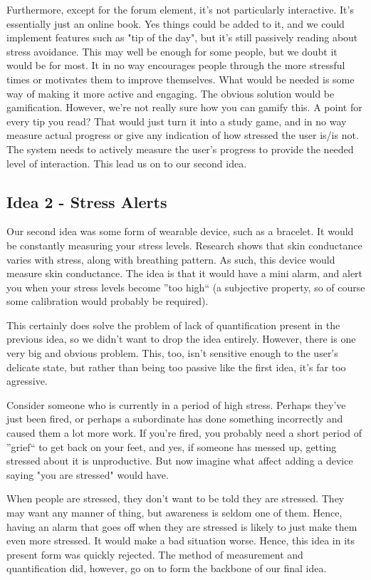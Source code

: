 \documentclass{scrartcl}
\begin{document}
Furthermore, except for the
forum element, it's not particularly interactive. It's essentially just an online book. Yes things could be added to it, and we
could implement features such as "tip of the day", but it's still passively reading about stress avoidance. This may well be
enough for some people, but we doubt it would be for most. It in no way encourages people through the more stressful times or
motivates them to improve themselves. What would be needed is some way of making it more active and engaging. The obvious
solution would be gamification. However, we're not really sure how you can gamify this. A point for every tip you read?
That would just turn it into a study game, and in no way measure actual progress or give any indication of how stressed the user
is/is not. The system needs to actively measure the user's progress to provide the needed level of interaction. This lead
us on to our second idea.

\subsection{Idea 2 - Stress Alerts}
Our second idea was some form of wearable device, such as a bracelet. It would be constantly measuring your stress levels.
Research shows that skin conductance varies with stress, along with breathing pattern. As such, this device would measure
skin conductance. The idea is that it would have a mini alarm, and alert you when your stress levels become ''too high``
(a subjective property, so of course some calibration would probably be required).

This certainly does solve the problem of lack of quantification present in the previous idea, so we didn't want to drop
the idea entirely. However, there is one very big and obvious problem. This, too, isn't sensitive enough to the user's
delicate state, but rather than being too passive like the first idea, it's far too agressive.

Consider someone who is currently in a period of high stress. Perhaps they've just been fired, or perhaps a subordinate has
done something incorrectly and caused them a lot more work. If you're fired, you probably need a short period of ''grief``
to get back on your feet, and yes, if someone has messed up, getting stressed about it is unproductive. But now imagine what
affect adding a device saying "you are stressed" would have.

When people are stressed, they don't want to be told they are stressed. They may want any manner of thing, but awareness
is seldom one of them. Hence, having an alarm that goes off when they are stressed is likely to just make them even more
stressed. It would make a bad situation worse. Hence, this idea in its present form was quickly rejected. The method of
measurement and quantification did, however, go on to form the backbone of our final idea.
\end{document}

